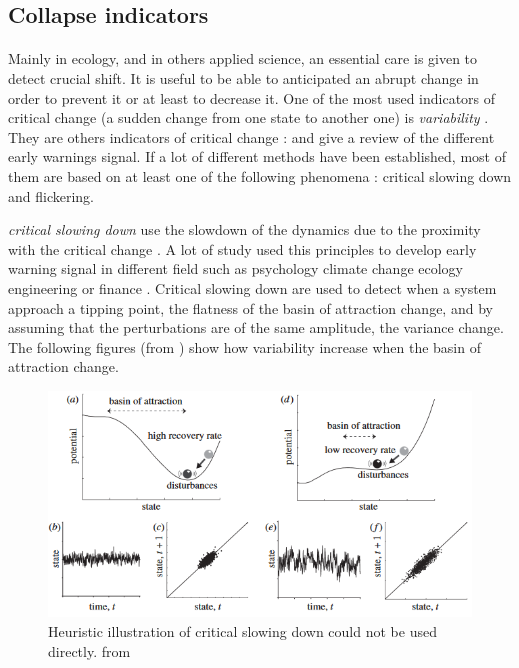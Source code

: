\documentclass{article}
\begin{document}
\subsection{Collapse indicators}

\paragraph{}
Mainly in ecology, and in others applied science, an essential care is given to detect crucial shift. It is useful to be able to anticipated an abrupt change in order to prevent it or at least to decrease it. One of the most used indicators of critical change (a sudden change from one state to another one) is \textit{variability} \citep{brock_variance_2006, carpenter2006rising, scheffer2015generic, dakos_robustness_2012, biggs_turning_2009}. They are others indicators of critical change :  \cite{scheffer_generic_2015} and \cite{dakos_methods_2012} give a review of the different early warnings signal. If a lot of different methods have been established, most of them are based on at least one of the following phenomena : critical slowing down and flickering.

\textit{critical slowing down} use the slowdown of the dynamics due to the proximity with the critical change \citep{dakos_critical_2014, dakos_slowing_nodate, scheffer_anticipating_2012}. A lot of study used this principles to develop early warning signal in different field such as psychology \citep{van_de_leemput_critical_2014} climate change \citep{lenton_early_2012} ecology \citep{chisholm_critical_2009, gandhi_critical_1998} engineering \citep{ren_early_2015} or finance \citep{diks_critical_2018}. Critical slowing down are used to detect when a system approach a tipping point, the flatness of the basin of attraction change, and by assuming that the perturbations are of the same amplitude, the variance change. The following figures (from \cite{lenton_early_2012}) show how variability increase when the basin of attraction change.

\begin{figure}[h]
\begin{center}
\includegraphics[width=12cm]{slowing_down.png}
\end{center}
\caption{\label{fig:temp}Heuristic illustration of critical slowing down could not be used directly. from \cite{lenton_early_2012}}
\end{figure}
\end{document}
